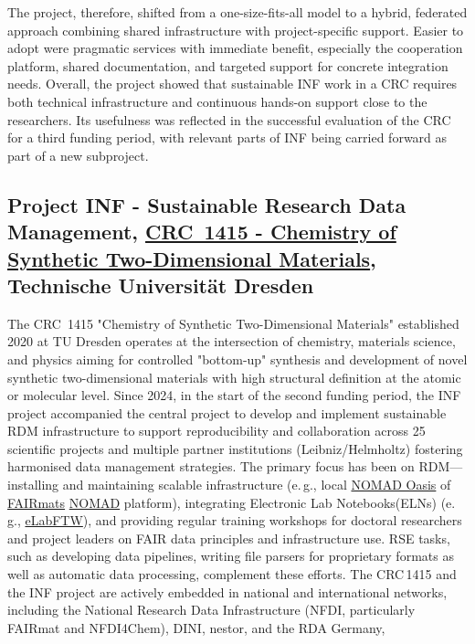 \documentclass{eceasst}
\newcommand{\eg}{e.\,g.}
\newcommand{\elabftw}{\href{https://www.elabftw.net/}{eLabFTW}}
\begin{document}
The project, therefore, shifted from a one-size-fits-all model to a hybrid, federated approach combining shared infrastructure with project-specific support.
Easier to adopt were pragmatic services with immediate benefit, especially the cooperation platform, shared documentation, and targeted support for concrete integration needs.
Overall, the project showed that sustainable INF work in a CRC requires both technical infrastructure and continuous hands-on support close to the researchers.
Its usefulness was reflected in the successful evaluation of the CRC for a third funding period, with relevant parts of INF being carried forward as part of a new subproject.

\subsection{Project INF - Sustainable Research Data Management, \href{https://gepris.dfg.de/gepris/projekt/417590517?language=en}{CRC~1415 -  Chemistry of Synthetic Two-Dimensional Materials}, Technische Universität Dresden}
\label{subsec:crc1415}
The CRC~1415 "Chemistry of Synthetic Two-Dimensional Materials" established 2020 at TU Dresden operates at the intersection of chemistry, materials science, and physics
 aiming for controlled "bottom-up" synthesis and development of novel synthetic two-dimensional materials with high structural definition at the atomic or molecular level.
Since 2024, in the start of the second funding period, the INF project accompanied the central project to develop and implement sustainable RDM
infrastructure to support reproducibility and collaboration across 25 scientific projects and multiple partner institutions (Leibniz/Helmholtz) fostering harmonised data management strategies.
The primary focus has been on RDM—installing and maintaining scalable infrastructure
(\eg, local \href{https://nomad-lab.eu/nomad-lab/nomad-oasis.html}{NOMAD Oasis} of \href{https://www.fairmat-nfdi.eu/fairmat/}{FAIRmats} \href{https://nomad-lab.eu/nomad-lab/nomad.html}{NOMAD} platform),
integrating Electronic Lab Notebooks(ELNs) (\eg, \elabftw),
and providing regular training workshops for doctoral researchers and project leaders on FAIR data principles and infrastructure use.
RSE tasks, such as developing data pipelines, writing file parsers for proprietary formats as well as automatic data processing, complement these efforts.
The CRC\,1415 and the INF project are actively embedded in national and international networks,
including the National Research Data Infrastructure (NFDI, particularly FAIRmat and NFDI4Chem), DINI, nestor, and the RDA Germany,
\end{document}
